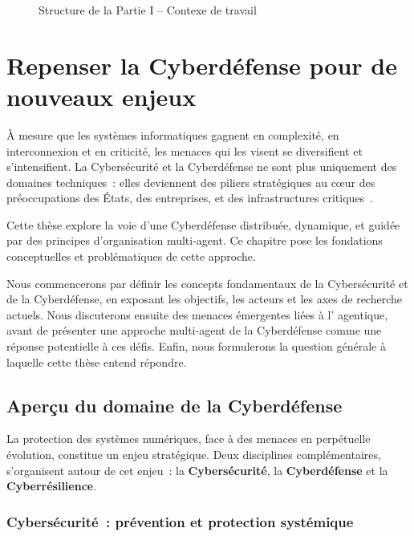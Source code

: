 \begin{figure}[h!]
  \centering
  \resizebox{0.8\textwidth}{!}{%
    
  }
  \caption{Structure de la Partie I -- Contexe de travail}
  \label{fig:organisation_manuscrit_partie_1}
\end{figure}

\clearpage
\thispagestyle{empty}
\null
\newpage

\chapter{Repenser la Cyberdéfense pour de nouveaux enjeux}

\noindent
À mesure que les systèmes informatiques gagnent en complexité, en interconnexion et en criticité, les menaces qui les visent se diversifient et s'intensifient. La Cybersécurité et la Cyberdéfense ne sont plus uniquement des domaines techniques~: elles deviennent des piliers stratégiques au cœur des préoccupations des États, des entreprises, et des infrastructures critiques~\cite{ObiohaVal2025}.

Cette thèse explore la voie d'une Cyberdéfense distribuée, dynamique, et guidée par des principes d'organisation multi-agent. Ce chapitre pose les fondations conceptuelles et problématiques de cette approche.

Nous commencerons par définir les concepts fondamentaux de la Cybersécurité et de la Cyberdéfense, en exposant les objectifs, les acteurs et les axes de recherche actuels. Nous discuterons ensuite des menaces émergentes liées à l' agentique, avant de présenter une approche multi-agent de la Cyberdéfense comme une réponse potentielle à ces défis. Enfin, nous formulerons la question générale à laquelle cette thèse entend répondre.

\section{Aperçu du domaine de la Cyberdéfense}\label{sec:cyberdef-panorama}

La protection des systèmes numériques, face à des menaces en perpétuelle évolution, constitue un enjeu stratégique. Deux disciplines complémentaires, s'organisent autour de cet enjeu~: la \textbf{Cybersécurité}, la \textbf{Cyberdéfense} et la \textbf{Cyberrésilience}.

\subsection*{Cybersécurité~: prévention et protection systémique}

